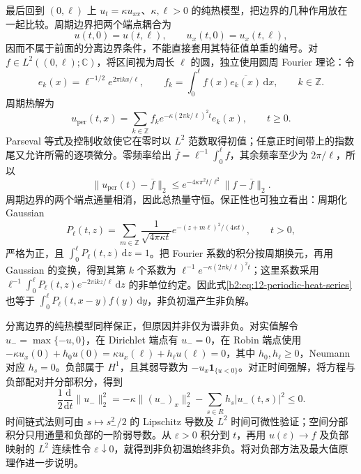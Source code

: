 最后回到 \((0,\ell)\) 上 \(u_t=\kappa u_{xx}\)、\(\kappa,\ell>0\) 的纯热模型，把边界的几种作用放在一起比较。周期边界把两个端点耦合为
\[
 u(t,0)=u(t,\ell),\qquad u_x(t,0)=u_x(t,\ell),
\]
因而不属于前面的分离边界条件，不能直接套用其特征值单重的编号。对 \(f\in L^2((0,\ell);\mathbb C)\)，将区间视为周长 \(\ell\) 的圆，独立使用圆周 Fourier 理论：令
\[
 e_k(x)=\ell^{-1/2}e^{2\pi\mathrm{i}kx/\ell},\qquad
 f_k=\int_0^\ell f(x)\overline{e_k(x)}\,\mathrm{d}x,
 \qquad k\in\mathbb Z.
\]
周期热解为
\begin{equation}\label{b2:eq:12-periodic-heat-series}
 u_{\mathrm{per}}(t,x)=\sum_{k\in\mathbb Z}
       f_ke^{-\kappa(2\pi k/\ell)^2t}e_k(x),\qquad t\geq0.
\end{equation}
Parseval 等式及控制收敛使它在零时以 \(L^2\) 范数取得初值；任意正时间带上的指数尾又允许所需的逐项微分。零频率给出 \(\overline f=\ell^{-1}\int_0^\ell f\)，其余频率至少为 \(2\pi/\ell\)，所以
\[
 \|u_{\mathrm{per}}(t)-\overline f\|_2
 \leq e^{-4\kappa\pi^2t/\ell^2}\|f-\overline f\|_2.
\]
周期边界的两个端点通量相消，因此总热量守恒。保正性也可独立看出：周期化 Gaussian
\[
 P_\ell(t,z)=\sum_{m\in\mathbb Z}
  \frac1{\sqrt{4\pi\kappa t}}
  e^{-(z+m\ell)^2/(4\kappa t)},\qquad t>0,
\]
严格为正，且 \(\int_0^\ell P_\ell(t,z)\,\mathrm{d}z=1\)。把 Fourier 系数的积分按周期换元，再用 Gaussian 的变换，得到其第 \(k\) 个系数为 \(\ell^{-1}e^{-\kappa(2\pi k/\ell)^2t}\)；这里系数采用 \(\ell^{-1}\int_0^\ell P_\ell(t,z)e^{-2\pi\mathrm{i}kz/\ell}\,\mathrm{d}z\) 的非单位约定。因此式\eqref{b2:eq:12-periodic-heat-series}也等于 \(\int_0^\ell P_\ell(t,x-y)f(y)\,\mathrm{d}y\)，非负初温产生非负解。

分离边界的纯热模型同样保正，但原因并非仅为谱非负。对实值解令 \(u_-=\max\{-u,0\}\)，在 Dirichlet 端点有 \(u_-=0\)，在 Robin 端点使用 \(-\kappa u_x(0)+h_0u(0)=\kappa u_x(\ell)+h_\ell u(\ell)=0\)，其中 \(h_0,h_\ell\geq0\)，Neumann 对应 \(h_s=0\)。负部属于 \(H^1\)，且其弱导数为 \(-u_x\mathbf1_{\{u<0\}}\)。对正时间强解，将方程与负部配对并分部积分，得到
\[
 \frac12\frac{\mathrm{d}}{\mathrm{d}t}\|u_-\|_2^2
 =-\kappa\|(u_-)_x\|_2^2
      -\sum_{s\in R}h_s|u_-(t,s)|^2\leq0.
\]
时间链式法则可由 \(s\mapsto s_-^2/2\) 的 Lipschitz 导数及 \(L^2\) 时间可微性验证；空间分部积分只用通量和负部的一阶弱导数。从 \(\varepsilon>0\) 积分到 \(t\)，再用 \(u(\varepsilon)\to f\) 及负部映射的 \(L^2\) 连续性令 \(\varepsilon\downarrow0\)，就得到非负初温始终非负。将对负部方法及最大值原理作进一步说明。

